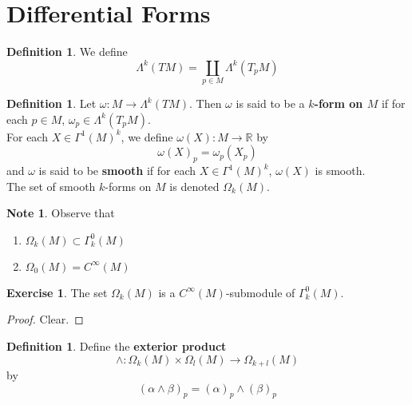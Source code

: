 \documentclass{book}
\theoremstyle{definition}
\newtheorem{defn}[definition]{Definition}
\newtheorem{note}[definition]{Note}
\newtheorem{ex}[definition]{Exercise}
\newcommand{\al}{\alpha}
\newcommand{\be}{\beta}
\newcommand{\om}{\omega}
\newcommand{\Gam}{\Gamma}
\newcommand{\Lam}{\Lambda}
\newcommand{\Om}{\Omega}
\newcommand{\R}{\mathbb{R}}
\DeclareMathOperator*{\0}{\mbf{0}}
\DeclareMathOperator*{\1}{\mbf{1}}
\begin{document}
	
	
	
	
	
	
	
	
	
	
	
	
	
	
	
	
	
	
	

	
	\newpage	
	\section{Differential Forms}
	
	\begin{defn}
		We define $$\Lam^k (TM) = \coprod_{p \in M} \Lam^k(T_p M)$$
	\end{defn}
	
	\begin{defn}
		Let $\om: M \rightarrow \Lam^k (TM)$. Then $\om$ is said to be a \textbf{$k$-form on $M$} if for each $p \in M$, $\om_p \in \Lam^k(T_pM)$.\\
		For each $X \in \Gam^1(M)^k$, we define $\om(X) : M \rightarrow \R$ by $$\om(X)_p = \om_p(X_p)$$
		and $\om$ is said to be \textbf{smooth} if for each $X \in \Gam^1(M)^k$, $\om(X)$ is smooth.\\
		The set of smooth $k$-forms on $M$ is denoted $\Om_k(M)$.\\
	\end{defn} 

	\begin{note}
		Observe that 
		\begin{enumerate}
		\item $\Om_k(M) \subset \Gamma^0_k(M)$
		\item $\Om_0(M) = C^{\infty}(M)$
		\end{enumerate}
	\end{note}
	
	\begin{ex}
	The set $\Om_k(M)$ is a $C^{\infty}(M)$-submodule of $\Gam^0_k(M)$.
	\end{ex}
	
	\begin{proof}
	Clear.
	\end{proof}

	

	\begin{defn}
		Define the \textbf{exterior product} $$\wedge: \Om_k(M) \times \Om_l(M) \rightarrow \Om_{k+l}(M) $$ by $$(\al \wedge \be)_p = (\al)_p \wedge (\be)_p$$
	\end{defn}
	
\end{document}
